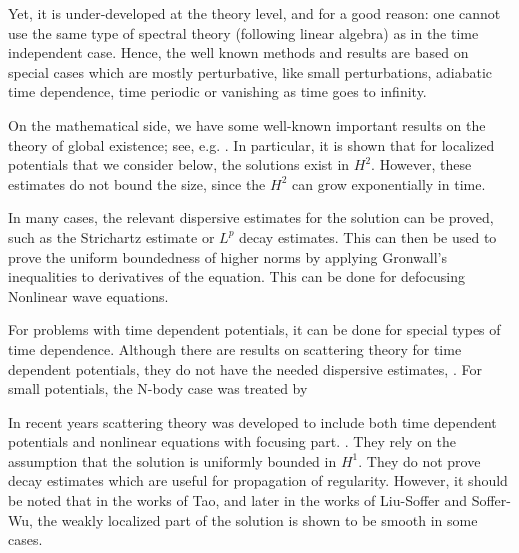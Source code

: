 \documentclass[11pt]{article}
\begin{document}
Yet, it is under-developed at the theory level, and for a good reason: one cannot use the same type of spectral theory (following linear algebra) as in the time independent case. Hence, the well known methods and results are based on special cases which are mostly perturbative, like small perturbations, adiabatic time dependence, time periodic or vanishing as time goes to infinity.


On the mathematical side, we have some well-known important results on the theory of global existence; see, e.g. \cite{yosida2012functional,reed1975ii,kitada1982scattering,kitada1983remarks,ruiz1994local,linares2014introduction}. In particular, it is shown that for localized potentials that we consider below, the solutions exist in $H^2.$ However, these estimates do not bound the size, since the $H^2$ can grow exponentially in time.

In many cases, the relevant dispersive estimates for the solution can be proved, such as the Strichartz estimate or $L^p$ decay estimates. This can then be used to prove the uniform boundedness of higher norms by applying Gronwall's inequalities to derivatives of the equation. This can be done for defocusing Nonlinear wave equations.

For problems with time dependent potentials, it can be done for special types of time dependence\cite{ rodnianski2004time,beceanu2019semilinear,soffer2025local,rodnianski2005dispersive,fishman2014multiscale,teufel2003adiabatic}. Although there are results on scattering theory for time dependent potentials, they do not have the needed dispersive estimates, \cite{kitada1983remarks,enss1983bound}.
For small potentials, the N-body case was treated by \cite{yajima2025boundedness}



In recent years scattering theory was developed to include both time dependent potentials and nonlinear equations with focusing part.
\cite{T2008,liu2020general,liu2025large,soffer2022large,soffer2025ℒ}. They rely on the assumption that the solution is uniformly bounded in $H^1.$ They do not prove decay estimates which are useful for propagation of regularity. However, it should be noted that in the works of Tao, and later in the works of Liu-Soffer and Soffer-Wu, the weakly localized part of the solution is shown to be smooth in some cases.
\end{document}

